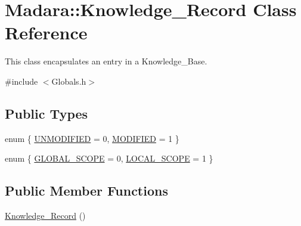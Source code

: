 \hypertarget{classMadara_1_1Knowledge__Record}{
\section{Madara::Knowledge\_\-Record Class Reference}
\label{d9/dcb/classMadara_1_1Knowledge__Record}
}


This class encapsulates an entry in a Knowledge\_\-Base.  




{\ttfamily \#include $<$Globals.h$>$}

\subsection*{Public Types}
\begin{DoxyCompactItemize}
\item 
enum \{ \hyperlink{classMadara_1_1Knowledge__Record_ad2b1ec153b2e1021cbd81eda234e02eaa85bb60bc156d325ad1a77de109bde780}{UNMODIFIED} =  0, 
\hyperlink{classMadara_1_1Knowledge__Record_ad2b1ec153b2e1021cbd81eda234e02eaae3fecd51f9f872e7c6a4da00e8445ec6}{MODIFIED} =  1
 \}
\item 
enum \{ \hyperlink{classMadara_1_1Knowledge__Record_a3b2ad17b8322d3a95b10ead6eb88d1f7ae756e53f33f43684c8d3871a37ea7994}{GLOBAL\_\-SCOPE} =  0, 
\hyperlink{classMadara_1_1Knowledge__Record_a3b2ad17b8322d3a95b10ead6eb88d1f7afe7aaa2933e02ca899099d1a0194867b}{LOCAL\_\-SCOPE} =  1
 \}
\end{DoxyCompactItemize}
\subsection*{Public Member Functions}
\begin{DoxyCompactItemize}
\item 
\hyperlink{classMadara_1_1Knowledge__Record_a80bed0d150d0875509deae50dbb3656d}{Knowledge\_\-Record} ()
\end{DoxyCompactItemize}
